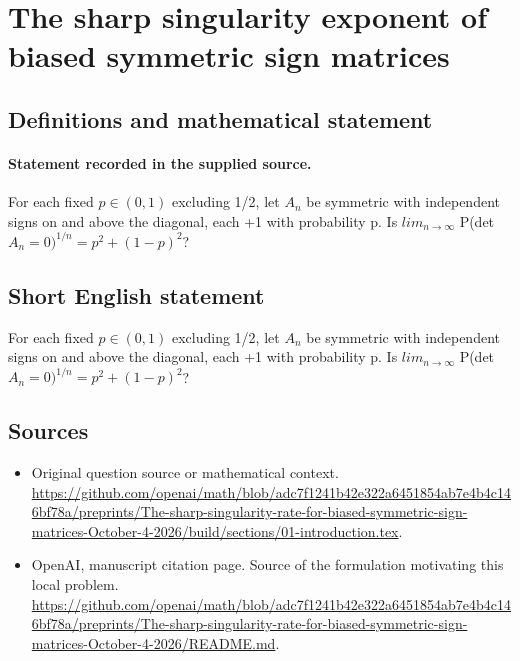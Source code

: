 \documentclass[11pt]{article}
\begin{document}
\section*{The sharp singularity exponent of biased symmetric sign matrices}\label{statement}
\subsection{Definitions and mathematical statement}
\paragraph{Statement recorded in the supplied source.}
For each fixed $p\in (0,1)$ excluding 1/2, let $A_n$ be symmetric with independent signs on and above the diagonal, each +1 with probability p. Is $lim_{n\to \infty }$ P(det $A_n=0)^{1/n}=p^2+(1-p)^2$?
\subsection{Short English statement}
For each fixed $p\in (0,1)$ excluding 1/2, let $A_n$ be symmetric with independent signs on and above the diagonal, each +1 with probability p. Is $lim_{n\to \infty }$ P(det $A_n=0)^{1/n}=p^2+(1-p)^2$?
\subsection{Sources}
\begin{itemize}
\item[S1] Original question source or mathematical context.
\url{https://github.com/openai/math/blob/adc7f1241b42e322a6451854ab7e4b4c146bf78a/preprints/The-sharp-singularity-rate-for-biased-symmetric-sign-matrices-October-4-2026/build/sections/01-introduction.tex}.
\item[S2] OpenAI, manuscript citation page. Source of the formulation motivating this local problem.
\url{https://github.com/openai/math/blob/adc7f1241b42e322a6451854ab7e4b4c146bf78a/preprints/The-sharp-singularity-rate-for-biased-symmetric-sign-matrices-October-4-2026/README.md}.
\end{itemize}
\end{document}
